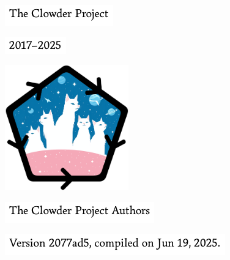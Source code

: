 \documentclass[oneside,a4paper,11pt]{book}
\begin{document}
\begin{center}%
    {}
\end{center}%
\vspace{7.25em}
\begin{center}
    \includegraphics[height=5.35\baselineskip]{text/title.pdf}%
\end{center}
\vspace{0.25em}
\begin{center}
    \includegraphics[height=2.75\baselineskip]{text/year.pdf}%
\end{center}
\vspace{5.0em}
\begin{center}
    \includegraphics[width=0.4\textwidth]{logo.png}%
\end{center}
\vspace{5.0em}
\begin{center}
    \includegraphics[height=3.5\baselineskip]{text/author.pdf}%
\end{center}
\vspace{-1.5em}
\begin{center}
    \includegraphics[height=3\baselineskip]{text/version.pdf}%
\end{center}
\end{document}
